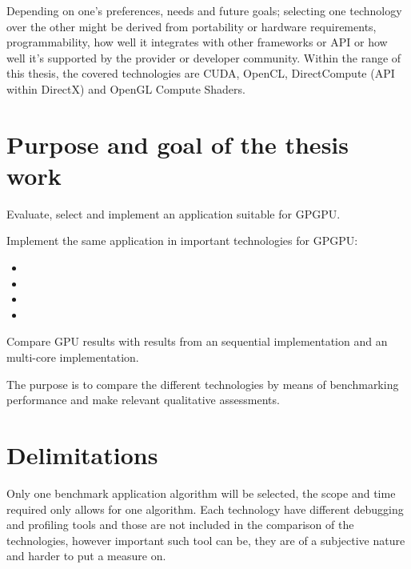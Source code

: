 Depending on one's preferences, needs and future goals; selecting one technology over the other might be derived from portability or hardware requirements, programmability, how well it integrates with other frameworks or \gls{API} or how well it's supported by the provider or developer community. Within the range of this thesis, the covered technologies are \gls{CUDA}, \gls{OpenCL}, DirectCompute (\gls{API} within DirectX) and \gls{OpenGL} Compute Shaders.

\section{Purpose and goal of the thesis work}
Evaluate, select and implement an application suitable for \gls{GPGPU}.

Implement the same application in important technologies for \gls{GPGPU}:
\begin{itemize}
	\item \CU
	\item \OCL
	\item \DX
	\item \GL
\end{itemize}
Compare \gls{GPU} results with results from an sequential {\CPP} implementation and an multi-core {\OMP} implementation.

The purpose is to compare the different technologies by means of benchmarking performance and make relevant qualitative assessments.

\section{Delimitations}
Only one benchmark application algorithm will be selected, the scope and time required only allows for one algorithm. Each technology have different debugging and profiling tools and those are not included in the comparison of the technologies, however important such tool can be, they are of a subjective nature and harder to put a measure on.